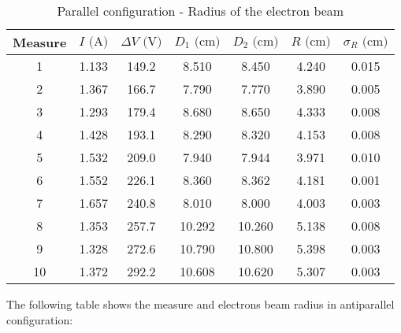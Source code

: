 \begin{table}[H]
    {\par\centering
    \begin{tabular}{ccccccc}
        \hline
        Measure & $I \text{ (A)}$ & $\Delta V \text{ (V)}$ & $D_1 \text{ (cm)}$ & $D_2 \text{ (cm)}$ & $R \text{ (cm)}$ & $\sigma_R \text{ (cm)}$ \\
        \hline
        1   &   1.133&   149.2&   8.510&   8.450& 4.240&  0.015\\
        2   &   1.367&   166.7&   7.790&   7.770& 3.890&  0.005\\
        3   &   1.293&   179.4&   8.680&   8.650& 4.333&  0.008\\
        4   &   1.428&   193.1&   8.290&   8.320& 4.153&  0.008\\
        5   &   1.532&   209.0&   7.940&   7.944& 3.971&  0.010\\
        6   &   1.552&   226.1&   8.360&   8.362& 4.181&  0.001\\
        7   &   1.657&   240.8&   8.010&   8.000& 4.003&  0.003\\
        8   &   1.353&   257.7&  10.292&  10.260& 5.138&  0.008\\
        9   &   1.328&   272.6&  10.790&  10.800& 5.398&  0.003\\
        10  &   1.372&   292.2&  10.608&  10.620& 5.307&  0.003\\
        \hline
    \end{tabular}
    \par}
    \caption{Parallel configuration - Radius of the electron beam}
\end{table}

The following table shows the measure and electrons beam radius in antiparallel configuration:

